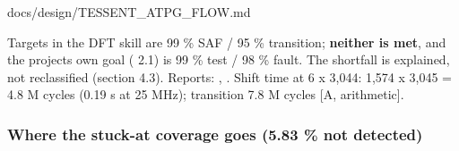 \begin{relocated}{docs/design/TESSENT_ATPG_FLOW.md}
\begin{landscape}
\end{landscape}

Targets in the DFT skill are 99 \% SAF / 95 \% transition;
\textbf{neither is met}, and the project\textquotesingle s own goal
( 2.1) is 99 \% test / 98 \% fault. The shortfall
is explained, not reclassified (section 4.3). Reports:
,
. Shift time at 6 x 3,044: 1,574 x
3,045 = 4.8 M cycles (0.19 s at 25 MHz); transition 7.8 M cycles {[}A,
arithmetic{]}.

\subsubsection{Where the stuck-at coverage goes (5.83 \% not
detected)}\label{tm:flow:tessent-atpg:43-where-the-stuck-at-coverage-goes-583-not-detected}

{\footnotesize\setlength{\tabcolsep}{3pt}

}
\end{relocated}
